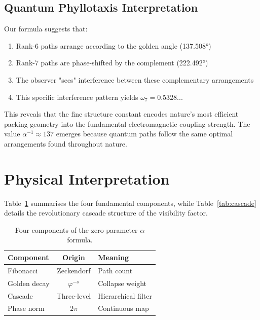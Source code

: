 \documentclass[%
 reprint,
 amsmath,amssymb,
 aps,
 prd,
 10pt,
 nofootinbib,      %
 longbibliography  %
]{revtex4-2}
\theoremstyle{definition}
\theoremstyle{remark}
\begin{document}
\subsection{Quantum Phyllotaxis Interpretation}

Our formula suggests that:
\begin{enumerate}
\item Rank-6 paths arrange according to the golden angle (137.508°)
\item Rank-7 paths are phase-shifted by the complement (222.492°)
\item The observer "sees" interference between these complementary arrangements
\item This specific interference pattern yields $\omega_7 = 0.5328...$
\end{enumerate}

This reveals that the fine structure constant encodes nature's most efficient packing geometry into the fundamental electromagnetic coupling strength. The value $\alpha^{-1} \approx 137$ emerges because quantum paths follow the same optimal arrangements found throughout nature.

\section{Physical Interpretation}\label{sec:interpretation}

Table~\ref{tab:contributions}
summarises the four fundamental components, while Table~\ref{tab:cascade} details the revolutionary cascade structure of the visibility factor.

\begin{table}[htbp]
  \centering
  \footnotesize
  \begin{tabular}{lcl}
    \toprule
    Component & Origin & Meaning \\
    \midrule
    Fibonacci & Zeckendorf & Path count \\
    Golden decay & $\varphi^{-s}$ & Collapse weight \\
    Cascade & Three-level & Hierarchical filter \\
    Phase norm & $2\pi$ & Continuous map \\
    \bottomrule
  \end{tabular}
  \caption{Four components of the zero-parameter $\alpha$ formula.}
  \label{tab:contributions}
\end{table}
\end{document}
